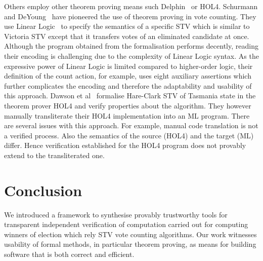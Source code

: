 \documentclass[10pt,conference]{IEEEtran}
\begin{document}
Others employ other theorem proving means such Delphin~\cite{Dolphin} or HOL4. Schurmann and DeYoung~\cite{DeYoung:2012:LLV} have pioneered the use of theorem proving in vote counting. They use Linear Logic~\cite{DBLP:journals/apal/Girard93} to specify the semantics of a specific STV which is similar to Victoria STV except that it transfers votes of an eliminated candidate at once. Although the program obtained from the formalisation performs decently, reading their encoding is challenging due to the complexity of Linear Logic syntax. As the expressive power of Linear Logic is limited compared to higher-order logic, their definition of the count action, for example, uses eight auxiliary assertions which further complicates
the encoding and therefore the adaptability and usability of this approach.  Dawson et al~\cite{DBLP:conf/voteid/DawsonGM15} formalise Hare-Clark STV of Tasmania state in the theorem prover HOL4 and verify properties about the algorithm. They however manually transliterate their  HOL4 implementation into an ML program. There are several issues with this approach. For example, manual code translation is not a verified process. Also the semantics of the source (HOL4) and
the target (ML) differ. Hence verification established for the HOL4 program does not provably extend to the
transliterated one.

\section{Conclusion}
We introduced a framework to synthesise provably trustworthy tools for transparent independent verification of computation carried out for computing winners of election which rely STV  vote counting algorithms. Our work witnesses usability of formal methods, in particular theorem proving, as means for building software that is both correct and efficient.
\end{document}
